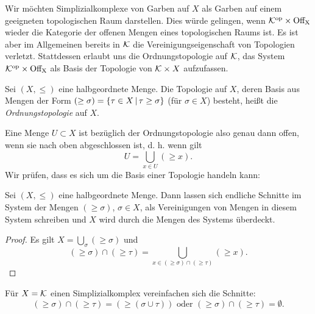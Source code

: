 Wir möchten Simplizialkomplexe von Garben auf $X$ als Garben auf einem
geeigneten topologischen Raum darstellen. Dies würde gelingen, wenn
$\mathcal{K}^\mathrm{op} \times \operatorname{Off_X}$ wieder die Kategorie der offenen Mengen eines
topologischen Raums ist. Es ist aber im Allgemeinen bereits in $\mathcal{K}$
die Vereinigungseigenschaft von Topologien verletzt. Stattdessen
erlaubt uns die Ordnungstopologie auf $\mathcal{K}$, das System $\mathcal{K}^\mathrm{op} \times
\operatorname{Off_X}$ als Basis der Topologie von $\mathcal{K} \times X$ aufzufassen.
\begin{defn}
  Sei $(X, \leq)$ eine halbgeordnete Menge. Die Topologie auf $X$,
  deren Basis aus Mengen der Form $(\geq \sigma) = \left\{ \tau \in
    X \,\middle|\, \tau \geq \sigma \right\}$ (für $\sigma \in X$) besteht, heißt die
  \emph{Ordnungstopologie} auf $X$.
\end{defn}
Eine Menge $U \subset X$ ist bezüglich der Ordnungstopologie also
genau dann offen, wenn sie nach oben abgeschlossen ist, d. h. wenn
gilt
\[ U = \bigcup_{x \in U} (\geq x). \]
Wir prüfen, dass es sich um die Basis einer Topologie handeln kann:
\begin{lemma}
  Sei $(X, \leq)$ eine halbgeordnete Menge. Dann lassen sich endliche
  Schnitte im System der Mengen $(\geq \sigma)$, $\sigma \in X$, als
  Vereinigungen von Mengen in diesem System schreiben und $X$ wird
  durch die Mengen des Systems überdeckt.
\end{lemma}
\begin{proof}
  Es gilt $X = \bigcup_\sigma (\geq \sigma)$ und
  \[ (\geq \sigma) \cap (\geq \tau)
  = \bigcup_{x \in (\geq \sigma) \cap (\geq \tau)} (\geq x).
  \]
\end{proof}
Für $X = \mathcal{K}$ einen Simplizialkomplex vereinfachen sich die Schnitte:
\begin{equation} \label{eq:simp-comp-meets}
  (\geq \sigma) \cap (\geq \tau) = (\geq (\sigma \cup \tau))
  \text{ oder }
  (\geq \sigma) \cap (\geq \tau) = \emptyset.
\end{equation}

